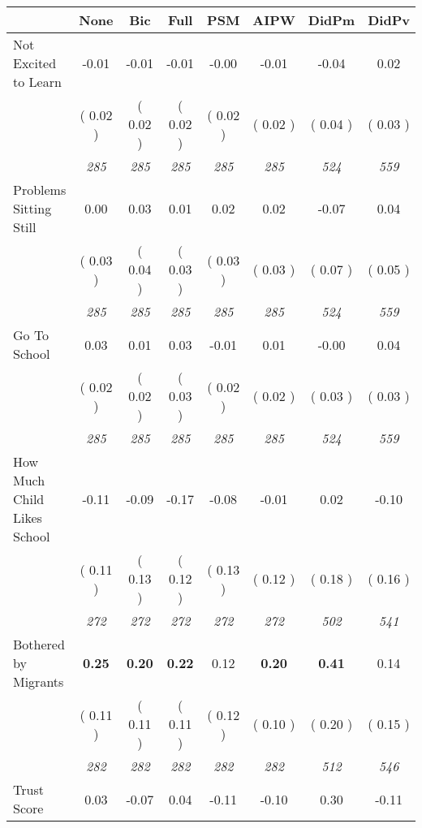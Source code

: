 \begin{tabular}{l c c c c c c c}
\toprule
 & None & Bic & Full & PSM & AIPW & DidPm & DidPv \\
\midrule
Not Excited to Learn &     -0.01 &     -0.01 &     -0.01 &     -0.00 &     -0.01 &     -0.04 &      0.02 \\
& (     0.02 ) & (     0.02 ) & (     0.02 ) & (     0.02 ) & (     0.02 ) & (     0.04 ) & (     0.03 ) \\
& \textit{ 285 } & \textit{ 285 } & \textit{ 285 } & \textit{ 285 } & \textit{ 285 } & \textit{ 524 } & \textit{ 559 } \\
Problems Sitting Still &      0.00 &      0.03 &      0.01 &      0.02 &      0.02 &     -0.07 &      0.04 \\
& (     0.03 ) & (     0.04 ) & (     0.03 ) & (     0.03 ) & (     0.03 ) & (     0.07 ) & (     0.05 ) \\
& \textit{ 285 } & \textit{ 285 } & \textit{ 285 } & \textit{ 285 } & \textit{ 285 } & \textit{ 524 } & \textit{ 559 } \\
Go To School &      0.03 &      0.01 &      0.03 &     -0.01 &      0.01 &     -0.00 &      0.04 \\
& (     0.02 ) & (     0.02 ) & (     0.03 ) & (     0.02 ) & (     0.02 ) & (     0.03 ) & (     0.03 ) \\
& \textit{ 285 } & \textit{ 285 } & \textit{ 285 } & \textit{ 285 } & \textit{ 285 } & \textit{ 524 } & \textit{ 559 } \\
How Much Child Likes School &     -0.11 &     -0.09 &     -0.17 &     -0.08 &     -0.01 &      0.02 &     -0.10 \\
& (     0.11 ) & (     0.13 ) & (     0.12 ) & (     0.13 ) & (     0.12 ) & (     0.18 ) & (     0.16 ) \\
& \textit{ 272 } & \textit{ 272 } & \textit{ 272 } & \textit{ 272 } & \textit{ 272 } & \textit{ 502 } & \textit{ 541 } \\
Bothered by Migrants & \textbf{      0.25 } & \textbf{      0.20 } & \textbf{      0.22 } &      0.12 & \textbf{     0.20} & \textbf{      0.41 } &      0.14 \\
& (     0.11 ) & (     0.11 ) & (     0.11 ) & (     0.12 ) & (     0.10 ) & (     0.20 ) & (     0.15 ) \\
& \textit{ 282 } & \textit{ 282 } & \textit{ 282 } & \textit{ 282 } & \textit{ 282 } & \textit{ 512 } & \textit{ 546 } \\
Trust Score &      0.03 &     -0.07 &      0.04 &     -0.11 &     -0.10 &      0.30 &     -0.11 \\

\end{tabular}
